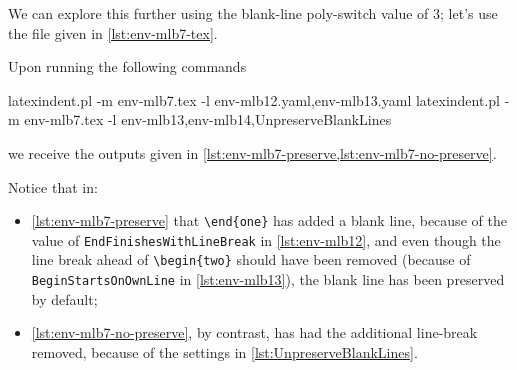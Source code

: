 \documentclass[10pt]{article}
\begin{document}
\begin{example}
  \begin{cmhtcbraster}[ raster left skip=-3.5cm,
    raster right skip=-2cm,
    raster force size=false,
    raster column 1/.style={add to width=-.2\textwidth},
    raster column 2/.style={add to width=.2\textwidth},
    raster column skip=.06\linewidth]
  \end{cmhtcbraster}
  \end{example}

  \begin{example}
  We can explore this further using the blank-line poly-switch value of $3$; let's use
  the file given in \cref{lst:env-mlb7-tex}.


  Upon running the following commands 

  \begin{commandshell}
latexindent.pl -m env-mlb7.tex -l env-mlb12.yaml,env-mlb13.yaml
latexindent.pl -m env-mlb7.tex -l env-mlb13,env-mlb14,UnpreserveBlankLines
\end{commandshell}

  we receive the outputs given in \cref{lst:env-mlb7-preserve,lst:env-mlb7-no-preserve}.


  Notice that in:
  \begin{itemize}
   \item \cref{lst:env-mlb7-preserve} that \lstinline!\end{one}! has added a blank line,
         because of the value of \texttt{EndFinishesWithLineBreak} in \vref{lst:env-mlb12}, and
         even though the line break ahead of \lstinline!\begin{two}! should have been removed
         (because of \texttt{BeginStartsOnOwnLine} in \vref{lst:env-mlb13}), the blank line has
         been preserved by default;
   \item \cref{lst:env-mlb7-no-preserve}, by contrast, has had the additional line-break removed,
         because of the settings in \cref{lst:UnpreserveBlankLines}.
  \end{itemize}
  \end{example}
\end{document}
